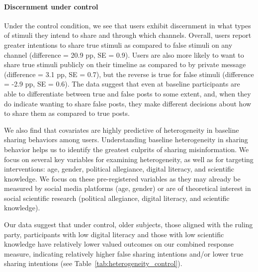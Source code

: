 \documentclass[letterpaper, 12pt, parskip=full,DIV=10]{scrartcl}
\begin{document}
\paragraph{Discernment under control}
Under the control condition, we see that users exhibit discernment in what types of stimuli they intend to share and through which channels. Overall, users report greater intentions to share true stimuli %
as compared to false stimuli %
on any channel (difference = 20.9 pp, SE = 0.9).  Users are also more likely to want to share true stimuli publicly on their timeline %
as compared to by private message %
(difference = 3.1 pp, SE = 0.7), but the reverse is true for false stimuli (difference = -2.9 pp, SE = 0.6). The data suggest that even at baseline participants are able to differentiate between true and false posts to some extent, and, when they do indicate wanting to share false posts, they make different decisions about how to share them as compared to true posts. 

We also find that covariates are highly predictive of heterogeneity in baseline sharing behaviors among users. Understanding baseline heterogeneity in sharing behavior helps us to identify the greatest culprits of sharing misinformation.  We focus on several key variables for examining heterogeneity, as well as for targeting interventions: age, gender, political allegiance, digital literacy, and scientific knowledge. We focus on these pre-registered variables as they may already be measured by social media platforms (age, gender) or are of theoretical interest in social scientific research (political allegiance, digital literacy, and scientific knowledge).

Our data suggest that under control, older subjects, those aligned with the ruling party, participants with low digital literacy and those with low scientific knowledge have relatively lower valued outcomes on our combined response measure, indicating relatively higher false sharing intentions and/or lower true sharing intentions (see Table~\ref{tab:heterogeneity_control}).
\end{document}
